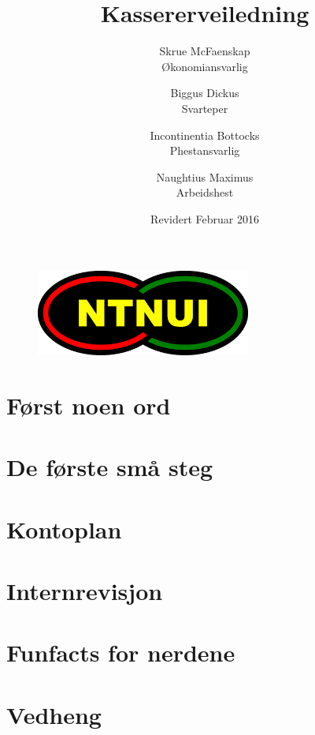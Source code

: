 \documentclass{article}
\title{\huge Kassererveiledning}
\date{Revidert Februar 2016}
\author{Skrue McFaenskap \\ Økonomiansvarlig 
		\and  Biggus Dickus \\ Svarteper
		\and Incontinentia Bottocks \\ Phestansvarlig 
		\and Naughtius Maximus \\ Arbeidshest}
\begin{document}
	\begin{figure}
		\centering
		\includegraphics[keepaspectratio=true, width=200pt]{bildr/logo}
	\end{figure}
\maketitle

\tableofcontents
\newpage


\section*{Først noen ord}
	

\section{De første små steg}
	

\newpage
	

\newpage
\section{Kontoplan}
	

\newpage
\section{Internrevisjon}

\newpage
\section*{Funfacts for nerdene}
%	



\newpage
\section{Vedheng}
	
\end{document}

